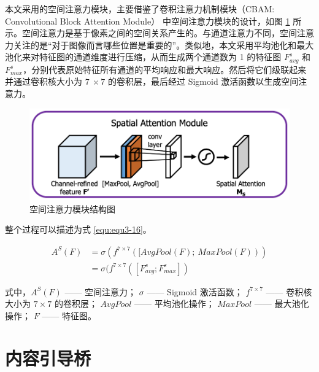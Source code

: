 本文采用的空间注意力模块，主要借鉴了卷积注意力机制模块（CBAM: Convolutional Block Attention Module）\cite{DBLP:conf/eccv/WooPLK18} 中空间注意力模块的设计，如图 \ref{fig:fig3-7} 所示。空间注意力是基于像素之间的空间关系产生的。与通道注意力不同，空间注意力关注的是“对于图像而言哪些位置是重要的”。类似地，本文采用平均池化和最大池化来对特征图的通道维度进行压缩，从而生成两个通道数为 1 的特征图 $F_{avg}^s$ 和 $F_{max}^s$，分别代表原始特征所有通道的平均响应和最大响应。然后将它们级联起来并通过卷积核大小为 $7\ \times 7$ 的卷积层，最后经过 Sigmoid 激活函数以生成空间注意力。

\begin{figure}[!htbp]
	\centering
	\includegraphics{figures/24.png}
	\caption{空间注意力模块结构图}
	\label{fig:fig3-7}
\end{figure}

整个过程可以描述为式 \ref{equ:equ3-16}。

\begin{equation}
\begin{aligned}
	A^S\left(F\right)&=\sigma\left(f^{7\times7}\left([AvgPool\left(F\right);\ MaxPool\left(F\right)\right)\right)\\
	&=\sigma(f^{7\times 7}([F_{avg}^s; F_{max}^s])
\end{aligned}
\label{equ:equ3-16}
\end{equation}

\noindent 式中，$A^S\left(F\right)$ —— 空间注意力；\newline
\indent\quad $\sigma$ —— Sigmoid 激活函数；\newline
\indent\quad $f^{7\times7}$ —— 卷积核大小为 $7 \times 7$ 的卷积层；\newline
\indent\quad $AvgPool$ —— 平均池化操作；\newline
\indent\quad $MaxPool$ —— 最大池化操作；\newline
\indent\quad $F$ —— 特征图。

\section{内容引导桥}

